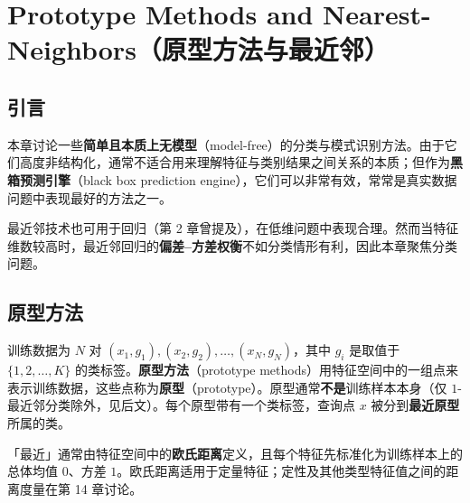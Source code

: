 \chapter{Prototype Methods and Nearest-Neighbors（原型方法与最近邻）}

\section{引言}

本章讨论一些\textbf{简单且本质上无模型}（model-free）的分类与模式识别方法。由于它们高度非结构化，通常不适合用来理解特征与类别结果之间关系的本质；但作为\textbf{黑箱预测引擎}（black box prediction engine），它们可以非常有效，常常是真实数据问题中表现最好的方法之一。

最近邻技术也可用于回归（第 2 章曾提及），在低维问题中表现合理。然而当特征维数较高时，最近邻回归的\textbf{偏差--方差权衡}不如分类情形有利，因此本章聚焦分类问题。

\section{原型方法}

\begin{definition}[数据与原型]
训练数据为 $N$ 对 $(x_1,g_1),(x_2,g_2),\dots,(x_N,g_N)$，其中 $g_i$ 是取值于 $\{1,2,\dots,K\}$ 的类标签。\textbf{原型方法}（prototype methods）用特征空间中的一组点来表示训练数据，这些点称为\textbf{原型}（prototype）。原型通常\textbf{不是}训练样本本身（仅 $1$-最近邻分类除外，见后文）。每个原型带有一个类标签，查询点 $x$ 被分到\textbf{最近原型}所属的类。
\end{definition}

「最近」通常由特征空间中的\textbf{欧氏距离}定义，且每个特征先标准化为训练样本上的总体均值 $0$、方差 $1$。欧氏距离适用于定量特征；定性及其他类型特征值之间的距离度量在第 14 章讨论。

